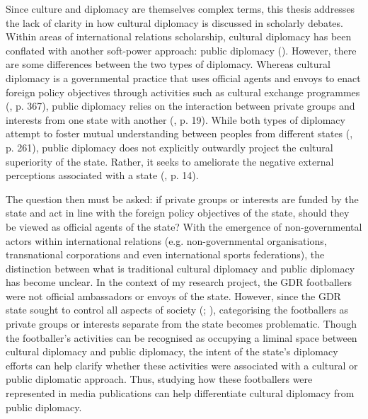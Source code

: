 Since culture and diplomacy are themselves complex terms, this thesis addresses the lack of clarity in how cultural diplomacy is discussed in scholarly debates. Within areas of international relations scholarship, cultural diplomacy has been conflated with another soft-power approach: public diplomacy (\cite{nye2008}). However, there are some differences between the two types of diplomacy. Whereas cultural diplomacy is a governmental practice that uses official agents and envoys to enact foreign policy objectives through activities such as cultural exchange programmes (\cite{ang2015}, p. 367), public diplomacy relies on the interaction between private groups and interests from one state with another (\cite{cull2008a}, p. 19). While both types of diplomacy attempt to foster mutual understanding between peoples from different states (\cite{hartig2016}, p. 261), public diplomacy does not explicitly outwardly project the cultural superiority of the state. Rather, it seeks to ameliorate the negative external perceptions associated with a state (\cite{melissen2011}, p. 14).

The question then must be asked: if private groups or interests are funded by the state and act in line with the foreign policy objectives of the state, should they be viewed as official agents of the state? With the emergence of non-governmental actors within international relations (e.g. non-governmental organisations, transnational corporations and even international sports federations), the distinction between what is traditional cultural diplomacy and public diplomacy has become unclear. In the context of my research project, the GDR footballers were not official ambassadors or envoys of the state. However, since the GDR state sought to control all aspects of society (\cite{fullbrook1995}; \cite{dennis2000}), categorising the footballers as private groups or interests separate from the state becomes problematic. Though the footballer’s activities can be recognised as occupying a liminal space between cultural diplomacy and public diplomacy, the intent of the state’s diplomacy efforts can help clarify whether these activities were associated with a cultural or public diplomatic approach. Thus, studying how these footballers were represented in media publications can help differentiate cultural diplomacy from public diplomacy.

